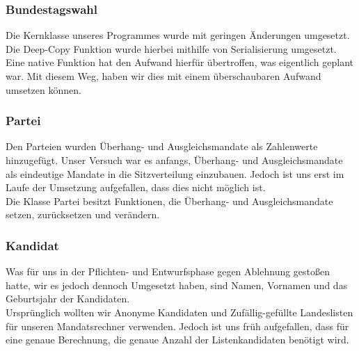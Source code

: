 \documentclass[12pt,a4paper,titlepage]{article}
\begin{document}
\subsubsection{Bundestagswahl}
Die Kernklasse unseres Programmes wurde mit geringen Änderungen umgesetzt. Die Deep-Copy Funktion wurde hierbei mithilfe von Serialisierung umgesetzt. Eine native Funktion hat den Aufwand hierfür übertroffen, was eigentlich geplant war. Mit diesem Weg, haben wir dies mit einem überschaubaren Aufwand umsetzen können.

\subsubsection{Partei}
Den Parteien wurden Überhang- und Ausgleichsmandate als Zahlenwerte hinzugefügt. Unser Versuch war es anfangs, Überhang- und Ausgleichsmandate als eindeutige Mandate in die Sitzverteilung einzubauen. Jedoch ist uns erst im Laufe der Umsetzung aufgefallen, dass dies nicht möglich ist. \\
Die Klasse Partei besitzt Funktionen, die Überhang- und Ausgleichsmandate setzen, zurücksetzen und verändern.

\subsubsection{Kandidat}
Was für uns in der Pflichten- und Entwurfsphase gegen Ablehnung gestoßen hatte, wir es jedoch dennoch Umgesetzt haben, sind Namen, Vornamen und das Geburtsjahr der Kandidaten. \\
Ursprünglich wollten wir Anonyme Kandidaten und Zufällig-gefüllte Landeslisten für unseren Mandatsrechner verwenden. Jedoch ist uns früh aufgefallen, dass für eine genaue Berechnung, die genaue Anzahl der Listenkandidaten benötigt wird.
\end{document}
